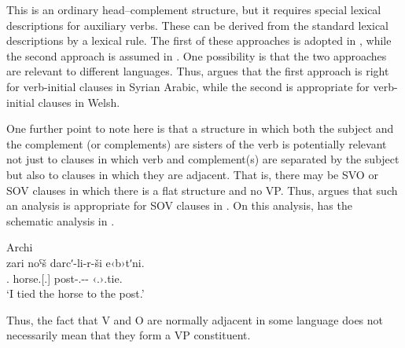 \documentclass[output=paper]{langsci/langscibook}
\begin{document}
\ea\label{ex:borsley:4.23}
\z
%
This is an ordinary head--complement structure, but it requires special lexical
descriptions for auxiliary verbs. These can be derived from the standard
lexical descriptions by a lexical rule. The first of these approaches is
adopted in \citet[36]{GinSag2000}, while the second approach is assumed in
\citet[410]{SagWasBen2003}. One possibility is that the two approaches are
relevant to different languages. Thus, \citet{Borsley1995} argues that the
first approach is right for verb-initial clauses in Syrian Arabic, while the
second is appropriate for verb-initial clauses in Welsh.

One further point to note here is that a structure in which both the subject
and the complement (or complements) are sisters of the verb is potentially
relevant not just to clauses in which verb and complement(s) are separated by
the subject but also to clauses in which they are adjacent. That is, there may
be SVO or SOV clauses in which there is a flat structure and no VP. Thus,
\citet{Borsley2016} argues that such an analysis is appropriate for SOV clauses
in . On this analysis,  has the schematic analysis in
.

\ea\label{ex:borsley:4.24}Archi\\
    \sn
    \gll zari noˤš darcʹ-li-r-ši e‹b›tʹni.\\
            \Fsg.\Erg{} horse.\Iii{}[\Sg.\Abs{}] post-\Obl.\Sg{}-\Cont-\All{} ‹\Iii.\Sg›.tie.\Pfv{}\\
    \glt    \enquote*{I tied the horse to the post.}
\z

\ea\label{ex:borsley:4.25}
\z
%
Thus, the fact that V and O are normally adjacent in some language does not
necessarily mean that they form a VP constituent.
\end{document}
